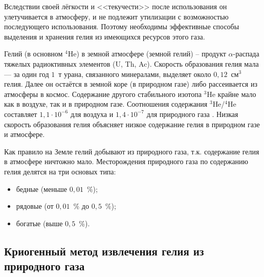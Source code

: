 Вследствии своей лёгкости и <<текучести>> после использования он улетучивается в атмосферу, и не подлежит утилизации с возможностью последующего использования. Поэтому необходимы эффективные способы выделения и хранения гелия из имеющихся ресурсов этого газа.


Гелий (в основном $^4$He) в земной атмосфере (земной гелий) -- продукт $\alpha$-распада тяжелых радиоктивных элементов  (U, Th, Ac). Скорость образования гелия мала --- за один год $1$~т урана, связанного минералами, выделяет около $0,12$~см$^3$ гелия. Далее он остаётся в земной коре (в природном газе) либо рассеивается из атмосферы в космос. Содержание другого стабильного изотопа $^3$He крайне мало как в воздухе, так и в природном газе. Соотношения содержания  $^3$He/$^4$He составляет $1,1\cdot 10^{-6}$ для воздуха и $1,4\cdot 10^{-7}$ для природного газа \cite{Fastovskii}. Низкая скорость образования гелия объясняет низкое содержание гелия в природном газе и атмосфере.

Как правило на Земле гелий добывают из природного газа, т.к. содержание гелия в атмосфере ничтожно мало. Месторождения природного газа по содержанию гелия делятся на три основых типа:
\begin{itemize}
	\item бедные (меньше $0,01$~\%);
	\item рядовые (от $0,01$~\% до $0,5$~\%);
	\item богатые (выше $0,5$~\%).	
\end{itemize}




\subsection{Криогенный метод извлечения гелия из природного газа} \label{section_1_1_1}

